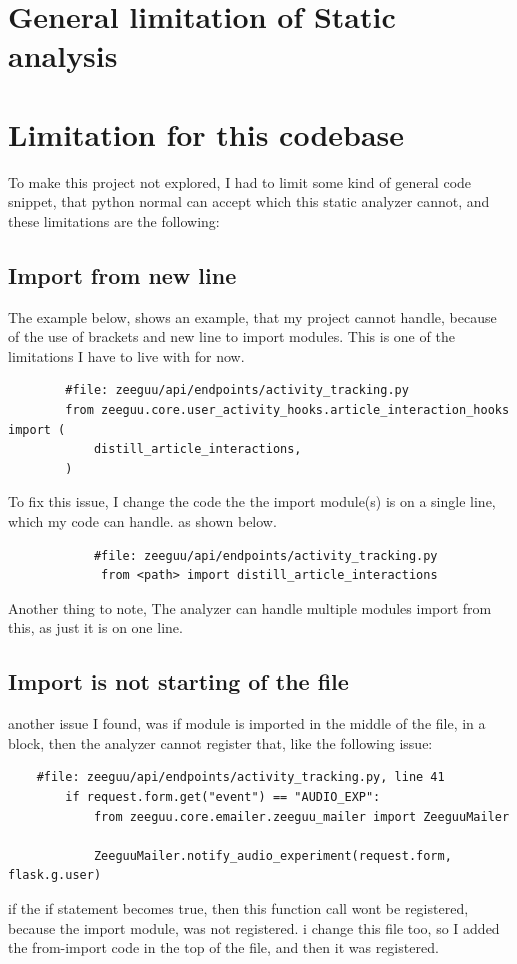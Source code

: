 \documentclass[12pt,a4paper]{report}
\begin{document}
    \section{General limitation of Static analysis}

    \section{Limitation for this codebase}
    To make this project not explored, I had to limit some kind of general code snippet, that python normal can accept which this static analyzer cannot, and these limitations are the following: 

    \subsection{Import from new line}
    The example below, shows an example, that my project cannot handle, because of the use of brackets and new line to import modules. This is one of the limitations I have to live with for now.

    \begin{lstlisting}
        #file: zeeguu/api/endpoints/activity_tracking.py
        from zeeguu.core.user_activity_hooks.article_interaction_hooks import (
            distill_article_interactions,
        )
        \end{lstlisting}

    To fix this issue, I change the code the the import module(s) is on a single line, which my code can handle. as shown below. 

        \begin{lstlisting}
            #file: zeeguu/api/endpoints/activity_tracking.py
             from <path> import distill_article_interactions
        \end{lstlisting}

    Another thing to note, The analyzer can handle multiple modules import from this, as just it is on one line. 
    
    \subsection{Import is not starting of the file}
    another issue I found, was if module is imported in the middle of the file, in a block, then the analyzer cannot register that, like the following issue: 
    \begin{lstlisting}
    #file: zeeguu/api/endpoints/activity_tracking.py, line 41
        if request.form.get("event") == "AUDIO_EXP":
            from zeeguu.core.emailer.zeeguu_mailer import ZeeguuMailer

            ZeeguuMailer.notify_audio_experiment(request.form, flask.g.user)
    \end{lstlisting}
    if the if statement becomes true, then this function call wont be registered, because the import module, was not registered. 
    i change this file too, so I added the from-import code in the top of the file, and then it was registered. 
\end{document}
